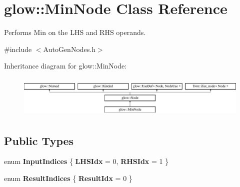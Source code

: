 \hypertarget{classglow_1_1_min_node}{}\section{glow\+:\+:Min\+Node Class Reference}
\label{classglow_1_1_min_node}


Performs Min on the L\+HS and R\+HS operands.  




{\ttfamily \#include $<$Auto\+Gen\+Nodes.\+h$>$}

Inheritance diagram for glow\+:\+:Min\+Node\+:\begin{figure}[H]
\begin{center}
\leavevmode
\includegraphics[height=2.028986cm]{classglow_1_1_min_node}
\end{center}
\end{figure}
\subsection*{Public Types}
\begin{DoxyCompactItemize}
\item 
\mbox{\label{classglow_1_1_min_node_a89b3dad42fe15f2e6fd6c5ebd282c558}} 
enum {\bfseries Input\+Indices} \{ {\bfseries L\+H\+S\+Idx} = 0, 
{\bfseries R\+H\+S\+Idx} = 1
 \}
\item 
\mbox{\label{classglow_1_1_min_node_a2ef83d2b0d6b12f902bdc3a761d85570}} 
enum {\bfseries Result\+Indices} \{ {\bfseries Result\+Idx} = 0
 \}
\end{DoxyCompactItemize}
